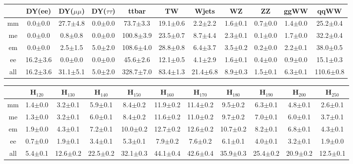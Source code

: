\begin{table}[!ht]
  \begin{center}
 {\small
  \begin{tabular} {|c|c|c|c|c|c|c|c|c|c|c|}
\hline
  & DY(ee) & DY($\mu\mu$) & DY($\tau\tau$) & ttbar & TW & Wjets & WZ & ZZ & ggWW & qqWW \\
  \hline
  \hline
  mm &  0.0$\pm$0.0 & 27.7$\pm$4.8 &  0.0$\pm$0.0 & 73.7$\pm$3.3 & 19.1$\pm$0.6 &  2.2$\pm$2.2 &  1.6$\pm$0.1 &  0.7$\pm$0.0 &  1.4$\pm$0.0 & 25.2$\pm$0.4 \\
  me &  0.0$\pm$0.0 &  0.8$\pm$0.8 &  0.0$\pm$0.0 & 100.8$\pm$3.9 & 23.5$\pm$0.7 &  8.7$\pm$4.4 &  2.3$\pm$0.1 &  0.1$\pm$0.0 &  1.7$\pm$0.0 & 32.2$\pm$0.4 \\
  em &  0.0$\pm$0.0 &  2.5$\pm$1.5 &  5.0$\pm$2.0 & 108.6$\pm$4.0 & 28.8$\pm$0.8 &  6.4$\pm$3.7 &  3.5$\pm$0.2 &  0.2$\pm$0.0 &  2.2$\pm$0.1 & 38.0$\pm$0.5 \\
  ee & 16.2$\pm$3.6 &  0.0$\pm$0.0 &  0.0$\pm$0.0 & 45.6$\pm$2.6 & 12.1$\pm$0.5 &  4.1$\pm$2.9 &  1.6$\pm$0.1 &  0.4$\pm$0.0 &  0.9$\pm$0.0 & 15.1$\pm$0.3 \\
 \hline
 all & 16.2$\pm$3.6 & 31.1$\pm$5.1 &  5.0$\pm$2.0 & 328.7$\pm$7.0 & 83.4$\pm$1.3 & 21.4$\pm$6.8 &  8.9$\pm$0.3 &  1.5$\pm$0.1 &  6.3$\pm$0.1 & 110.6$\pm$0.8 \\
 \hline
  \end{tabular}
  }
 {\small
  \begin{tabular} {|c|c|c|c|c|c|c|c|c|c|c|}
  \hline
     &   H$_{120}$ &  H$_{130}$ &    H$_{140}$ &   H$_{150}$ &   H$_{160}$ &   H$_{170}$ &   H$_{180}$ &   H$_{190}$ &   H$_{200}$ &   H$_{250}$ \\
  \hline
  \hline
  mm &  1.4$\pm$0.0 &  3.2$\pm$0.1 &  5.9$\pm$0.1 &  8.4$\pm$0.2 & 11.9$\pm$0.2 & 11.4$\pm$0.2 &  9.5$\pm$0.2 &  6.3$\pm$0.1 &  4.8$\pm$0.1 &  2.6$\pm$0.1 \\
  me &  1.3$\pm$0.0 &  3.2$\pm$0.1 &  6.0$\pm$0.1 &  8.4$\pm$0.2 & 11.6$\pm$0.2 & 11.0$\pm$0.2 &  9.7$\pm$0.2 &  7.0$\pm$0.1 &  6.0$\pm$0.1 &  3.7$\pm$0.1 \\
  em &  1.9$\pm$0.0 &  4.3$\pm$0.1 &  7.2$\pm$0.1 & 10.0$\pm$0.2 & 12.7$\pm$0.2 & 12.6$\pm$0.2 & 10.7$\pm$0.2 &  8.2$\pm$0.1 &  6.8$\pm$0.1 &  4.3$\pm$0.1 \\
  ee &  0.7$\pm$0.0 &  1.9$\pm$0.1 &  3.4$\pm$0.1 &  5.3$\pm$0.1 &  7.9$\pm$0.2 &  7.6$\pm$0.2 &  6.1$\pm$0.1 &  4.0$\pm$0.1 &  3.2$\pm$0.1 &  1.9$\pm$0.0 \\
  \hline
  all &  5.4$\pm$0.1 & 12.6$\pm$0.2 & 22.5$\pm$0.2 & 32.1$\pm$0.3 & 44.1$\pm$0.4 & 42.6$\pm$0.4 & 35.9$\pm$0.3 & 25.4$\pm$0.2 & 20.9$\pm$0.2 & 12.5$\pm$0.1 \\


\end{tabular}}
\end{center}
\end{table}
